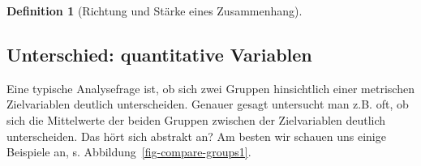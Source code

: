 \documentclass[
  a4paper,
  DIV=11]{scrreprt}
\theoremstyle{definition}
\theoremstyle{definition}
\theoremstyle{definition}
\newtheorem{definition}{Definition}[chapter]
\theoremstyle{remark}
\begin{document}
\begin{definition}[Richtung und Stärke eines
Zusammenhang]
\subsection{Unterschied: quantitative
Variablen}\label{unterschied-quantitative-variablen}

Eine typische Analysefrage ist, ob sich zwei Gruppen hinsichtlich einer
metrischen Zielvariablen deutlich unterscheiden. Genauer gesagt
untersucht man z.B. oft, ob sich die Mittelwerte der beiden Gruppen
zwischen der Zielvariablen deutlich unterscheiden. Das hört sich
abstrakt an? Am besten wir schauen uns einige Beispiele an, s.
Abbildung~\ref{fig-compare-groups1}.

\begin{figure}

\begin{minipage}{0.50\linewidth}



\end{minipage}%
%
\begin{minipage}{0.50\linewidth}

\end{minipage}
\end{figure}
\end{definition}
\end{document}
